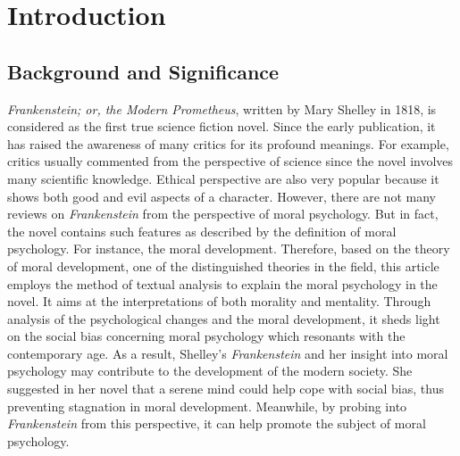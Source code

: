 \chapter{Introduction} %
\label{cha:introduction}
\section{Background and Significance} %
\label{sec:background_significance}
\begin{text}

\textit{Frankenstein; or, the Modern Prometheus}, written by Mary Shelley in 1818, is considered as the first true science fiction novel. Since the early publication, it has raised the awareness of many critics for its profound meanings. For example, critics usually commented from the perspective of science since the novel involves many scientific knowledge. Ethical perspective are also very popular because it shows both good and evil aspects of a character. However, there are not many reviews on \textit{Frankenstein} from the perspective of moral psychology. But in fact, the novel contains such features as described by the definition of moral psychology. For instance, the moral development. Therefore, based on the theory of moral development, one of the distinguished theories in the field, this article employs the method of textual analysis to explain the moral psychology in the novel. It aims at the interpretations of both morality and mentality. Through analysis of the psychological changes and the moral development, it sheds light on the social bias concerning moral psychology which resonants with the contemporary age. As a result, Shelley's \textit{Frankenstein} and her insight into moral psychology may contribute to the development of the modern society. She suggested in her novel that a serene mind could help cope with social bias, thus preventing stagnation in moral development. Meanwhile, by probing into \textit{Frankenstein} from this perspective, it can help promote the subject of moral psychology.

\end{text}


